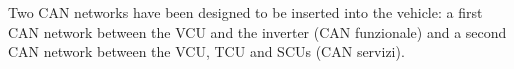 Two C\+AN networks have been designed to be inserted into the vehicle\+: a first C\+AN network between the V\+CU and the inverter (C\+AN funzionale) and a second C\+AN network between the V\+CU, T\+CU and S\+C\+Us (C\+AN servizi). 